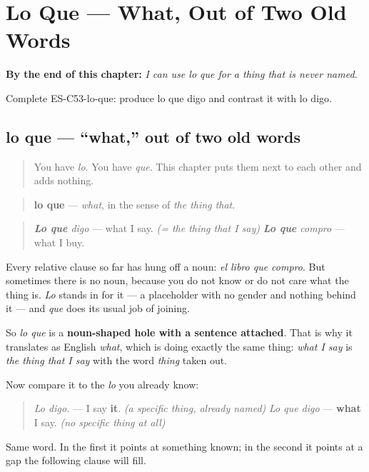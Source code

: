 
\chapter{Lo Que --- What, Out of Two Old Words}
\label{ch:lo-que}

\begin{chapteropening}
\textbf{By the end of this chapter:} \emph{I can use lo que for a thing that is never named.}

Complete ES-C53-lo-que: produce lo que digo and contrast it with lo digo.
\end{chapteropening}

\section[lo que]{lo que — \textquotedblleft{}what,\textquotedblright{} out of two old words}

\label{lesson:ES-C53-lo-que}



\begin{quote}
You have \emph{lo}. You have \emph{que}. This chapter puts them next to each other and adds nothing.
\end{quote}

\begin{grammarlens}[title={Grammar Lens: a noun-shaped hole}]
\begin{quote}
\textbf{lo que} — \emph{what}, in the sense of \emph{the thing that}.
\end{quote}

\begin{quote}
\emph{\textbf{Lo que} digo} — what I say. \emph{(= the thing that I say)} \emph{\textbf{Lo que} compro} — what I buy.
\end{quote}

Every relative clause so far has hung off a noun: \emph{el libro que compro}. But sometimes there is no noun, because you do not know or do not care what the thing is. \emph{Lo} stands in for it — a placeholder with no gender and nothing behind it — and \emph{que} does its usual job of joining.

So \emph{lo que} is a \textbf{noun-shaped hole with a sentence attached}. That is why it translates as English \emph{what}, which is doing exactly the same thing: \emph{what I say} is \emph{the thing that I say} with the word \emph{thing} taken out.

Now compare it to the \emph{lo} you already know:

\begin{quote}
\emph{Lo digo.} — I say \textbf{it}. \emph{(a specific thing, already named)} \emph{Lo que digo} — \textbf{what} I say. \emph{(no specific thing at all)}
\end{quote}

Same word. In the first it points at something known; in the second it points at a gap the following clause will fill.
\end{grammarlens}

